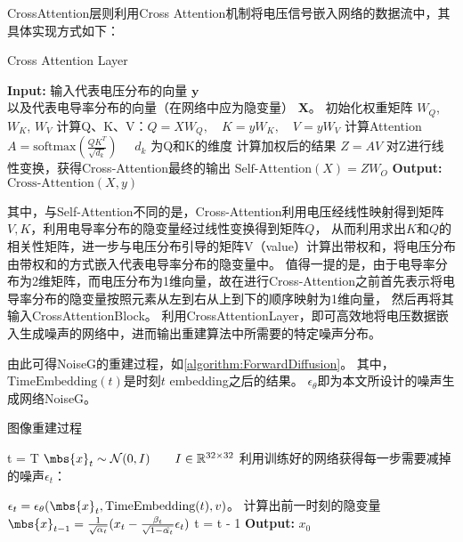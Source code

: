 CrossAttention层则利用Cross Attention机制将电压信号嵌入网络的数据流中，其具体实现方式如下：

\begin{algorithm}[h]
    
    \caption{Cross Attention Layer}
    \begin{algorithmic}[1]
        \State \textbf{Input:} 输入代表电压分布的向量 $\boldsymbol{y}$\\
        以及代表电导率分布的向量（在网络中应为隐变量） $\boldsymbol{X}$。
        \State 初始化权重矩阵 $W_Q$, $W_K$, $W_V$
        \State 计算Q、K、V：$Q = XW_Q, \quad K = yW_K, \quad V = yW_V$
        \State 计算Attention  $A = \text{softmax}\left(\frac{QK^T}{\sqrt{d_k}}\right) \quad $ $d_k$ 为Q和K的维度 
        \State 计算加权后的结果 $Z = AV$
        \State 对Z进行线性变换，获得Cross-Attention最终的输出  $\text{Self-Attention}(X) = ZW_O$
        \State \textbf{Output:} $\text{Cross-Attention}(X, y)$
    \end{algorithmic}
    \label{algorithm:CrossAttention}
\end{algorithm}

其中，与Self-Attention不同的是，Cross-Attention利用电压经线性映射得到矩阵$V, K$，利用电导率分布的隐变量经过线性变换得到矩阵$Q$，
从而利用求出$K$和$Q$的相关性矩阵，进一步与电压分布引导的矩阵V（value）计算出带权和，将电压分布由带权和的方式嵌入代表电导率分布的隐变量中。
值得一提的是，由于电导率分布为2维矩阵，而电压分布为1维向量，故在进行Cross-Attention之前首先表示将电导率分布的隐变量按照元素从左到右从上到下的顺序映射为1维向量，
然后再将其输入CrossAttentionBlock。
利用CrossAttentionLayer，即可高效地将电压数据嵌入生成噪声的网络中，进而输出重建算法中所需要的特定噪声分布。

由此可得NoiseG的重建过程，如\cref{algorithm:ForwardDiffusion}。
其中，$\text{TimeEmbedding}(t)$是时刻$t$ embedding之后的结果。
$\epsilon_\theta$即为本文所设计的噪声生成网络NoiseG。
\begin{algorithm}[H]
    
    \caption{图像重建过程}
    \begin{algorithmic}[1]

        \State t = T
        \State $\mbs{x}_t \sim \mathcal{N}(0, I) \qquad I \in \mathbb{R}^{32 \times 32}$
        \State 利用训练好的网络获得每一步需要减掉的噪声$\epsilon_t$：
        
        $\epsilon_t = \epsilon_\theta(\mbs{x}_t, \text{TimeEmbedding}(t), v)$。
        \State 计算出前一时刻的隐变量$\mbs{x}_{t-1} = \frac{1}{\sqrt{\alpha_t}}(x_t - \frac{\beta_t}{\sqrt{1-\hat{\alpha_t}}}\epsilon_t)$
        \State t = t - 1
        \EndWhile
        \State \textbf{Output:} $x_0$
    \end{algorithmic}
    \label{algorithm:ForwardDiffusion}
\end{algorithm}


